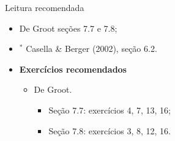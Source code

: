 \begin{frame}{Leitura recomendada}
\begin{itemize}
 \item[\faBook] De Groot seções 7.7 e 7.8;
 \item[\faBook] $^\ast$ Casella \& Berger (2002), seção 6.2.
 \item {\large\textbf{Exercícios recomendados}}
 \begin{itemize}
  \item[\faBookmark] De Groot.
  \begin{itemize}
   \item Seção 7.7: exercícios 4, 7, 13, 16;
   \item Seção 7.8: exercícios 3, 8, 12, 16.
  \end{itemize}   
  \end{itemize}
 \end{itemize} 
\end{frame}
